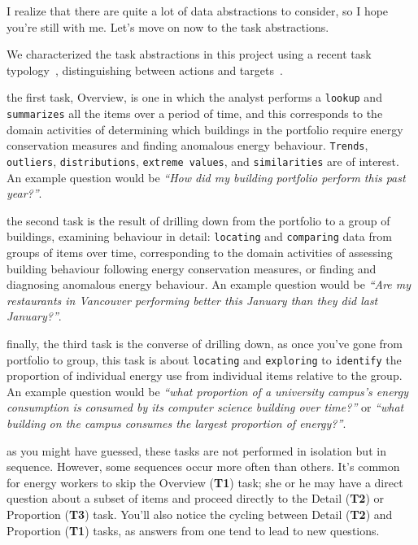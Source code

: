 \documentclass[journal]{vgtc}                %
\newcommand{\bstart}[1]{\vspace{1mm} \noindent{\textbf{#1:}}}
\begin{document}

I realize that there are quite a lot of data abstractions to consider, so I hope you're still with me. Let's move on now to the task abstractions.

We characterized the task abstractions in this project using a recent task typology~\cite{Brehmer2013}, distinguishing between actions and targets~\cite{Munzner2014}.

\bstart{T1 / Overview} the first task, Overview, is one in which the analyst performs a {\tt lookup} and {\tt summarizes} all the items over a period of time, and this corresponds to the domain activities of determining which buildings in the portfolio require energy conservation measures and finding anomalous energy behaviour. 
{\tt Trends}, {\tt outliers}, {\tt distributions}, {\tt extreme values}, and {\tt similarities} are of interest. 
An example question would be {\it ``How did my building portfolio perform this past year?''}.

\bstart{T2 / Detail} the second task is the result of drilling down from the portfolio to a group of buildings, examining behaviour in detail: {\tt locating} and {\tt comparing} data from groups of items over time, corresponding to the domain activities of assessing building behaviour following energy conservation measures, or finding and diagnosing anomalous energy behaviour. 
An example question would be {\it ``Are my restaurants in Vancouver performing better this January than they did last January?''}.

\bstart{T3 / Proportion} finally, the third task is the converse of drilling down, as once you've gone from portfolio to group, this task is about {\tt locating} and {\tt exploring} to {\tt identify} the proportion of individual energy use from individual items relative to the group.
An example question would be {\it ``what proportion of a university campus's energy consumption is consumed by its computer science building over time?''} or {\it ``what building on the campus consumes the largest proportion of energy?''}.

\bstart{Task sequences} as you might have guessed, these tasks are not performed in isolation but in sequence. 
However, some sequences occur more often than others. 
It's common for energy workers to skip the Overview ({\bf T1}) task; she or he may have a direct question about a subset of items and proceed directly to the Detail ({\bf T2}) or Proportion ({\bf T3}) task. 
You'll also notice the cycling between Detail ({\bf T2}) and Proportion ({\bf T1}) tasks, as answers from one tend to lead to new questions.
\end{document}
